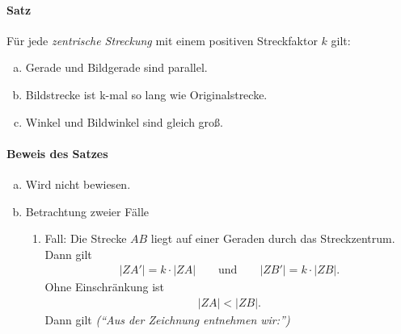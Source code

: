 \documentclass[11pt]{article}
\let\marginpar\marginnote
\begin{document}
\paragraph{Satz}
Für jede \textit{zentrische Streckung} mit einem positiven Streckfaktor $ k $ gilt:
\begin{enumerate}[(a)]
	\item Gerade und Bildgerade sind parallel.
	\item Bildstrecke ist k-mal so lang wie Originalstrecke.
	\item Winkel und Bildwinkel sind gleich groß.
\end{enumerate}
\paragraph{Beweis des Satzes}
\begin{enumerate}[(a)]
	\item Wird nicht bewiesen.
	\item Betrachtung zweier Fälle
	\begin{enumerate}[1.]
		\item Fall: Die Strecke $ AB $ liegt auf einer Geraden durch das Streckzentrum. \marginpar{$ Z \in A\lor B $}\\
		Dann gilt
		\begin{equation*}
		\begin{aligned}
		\left|ZA'\right| = k \cdot \left|ZA\right| \qquad \text{und} \qquad \left|ZB'\right| = k\cdot \left|ZB\right|.
		\end{aligned}
		\end{equation*}
		Ohne Einschränkung ist
		\begin{equation*}
		\begin{aligned}
		\left|ZA\right| < \left|ZB\right|.
		\end{aligned}
		\end{equation*}
		Dann gilt \textit{(\enquote{Aus der Zeichnung entnehmen wir:})}
		\begin{center}
\end{center}
\end{enumerate}
\end{enumerate}
\end{document}

